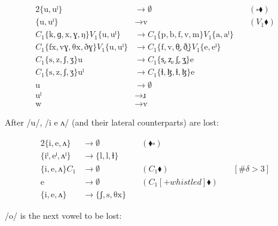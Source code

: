 \documentclass{book}
\begin{document}
\begin{alignat*}{2}
  \{\text{u}, \text{uˡ}\} &\rightarrow \emptyset &\quad(\square \blacklozenge) \\
  \{\text{u}, \text{uˡ}\} &\rightarrow \text{v} &\quad(V_1 \blacklozenge) \\
  C_1\{\text{k}, \text{ɡ}, \text{x}, \text{ɣ}, \text{ŋ}\} V_1\{\text{u}, \text{uˡ}\} &\rightarrow
    C_1\{\text{p}, \text{b}, \text{f}, \text{v}, \text{m}\} V_1\{\text{a}, \text{aˡ}\} \\
  C_1\{\text{fx}, \text{vɣ}, \text{θx}, \text{ðɣ}\} V_1\{\text{u}, \text{uˡ}\} &\rightarrow
    C_1\{\text{f}, \text{v}, \text{θ̼}, \text{ð̼}\} V_1\{\text{e}, \text{eˡ}\} \\
  C_1\{\text{s}, \text{z}, \text{ʃ}, \text{ʒ}\} \text{u} &\rightarrow
    C_1\{\text{s͎}, \text{z͎}, \text{ʃ͎}, \text{ʒ͎}\} \text{e} \\
  C_1\{\text{s}, \text{z}, \text{ʃ}, \text{ʒ}\} \text{uˡ} &\rightarrow
    C_1\{\text{ɬ}, \text{ɮ}, \text{ɬ}, \text{ɮ}\} \text{e} \\
  \text{u} &\rightarrow \emptyset \\
  \text{uˡ} &\rightarrow \text{ɹ} \\
  \text{w} &\rightarrow \text{v}
\end{alignat*}

After /u/, /i e ʌ/ (and their lateral counterparts) are lost:

\begin{alignat*}{2}
  \{\text{i}, \text{e}, \text{ʌ}\} &\rightarrow
    \emptyset &\quad(\blacklozenge \square) \\
  \{\text{iˡ}, \text{eˡ}, \text{ʌˡ}\} &\rightarrow
    \{\text{l}, \text{l}, \text{ɫ}\} \\
  \{\text{i}, \text{e}, \text{ʌ}\} C_1 &\rightarrow
    \emptyset &\quad(C_1 \blacklozenge) &\quad[\#\delta > 3] \\
  \text{e} &\rightarrow \emptyset &\quad(C_1[+whistled] \blacklozenge) \\
  \{\text{i}, \text{e}, \text{ʌ}\} &\rightarrow
    \{\text{ʃ}, \text{s}, \text{θx}\}
\end{alignat*}

/o/ is the next vowel to be lost:
\end{document}
